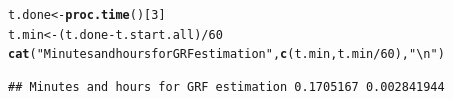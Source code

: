 \documentclass[9pt]{article}\usepackage[]{graphicx}\usepackage[]{xcolor}
\makeatletter
\newcommand{\hlnum}[1]{\textcolor[rgb]{0.686,0.059,0.569}{#1}}%
\newcommand{\hlstr}[1]{\textcolor[rgb]{0.192,0.494,0.8}{#1}}%
\newcommand{\hlopt}[1]{\textcolor[rgb]{0,0,0}{#1}}%
\newcommand{\hlstd}[1]{\textcolor[rgb]{0.345,0.345,0.345}{#1}}%
\newcommand{\hlkwb}[1]{\textcolor[rgb]{0.69,0.353,0.396}{#1}}%
\newcommand{\hlkwd}[1]{\textcolor[rgb]{0.737,0.353,0.396}{\textbf{#1}}}%
\newenvironment{kframe}{%
 \def\at@end@of@kframe{}%
 \ifinner\ifhmode%
  \def\at@end@of@kframe{\end{minipage}}%
  \begin{minipage}{\columnwidth}%
 \fi\fi%
 \def\FrameCommand##1{\hskip\@totalleftmargin \hskip-\fboxsep
 \colorbox{shadecolor}{##1}\hskip-\fboxsep
     \hskip-\linewidth \hskip-\@totalleftmargin \hskip\columnwidth}%
 \MakeFramed {\advance\hsize-\width
   \@totalleftmargin\z@ \linewidth\hsize
   \@setminipage}}%
 {\par\unskip\endMakeFramed%
 \at@end@of@kframe}
\newenvironment{knitrout}{}{} %
\theoremstyle{definition}
\theoremstyle{remark}
\makeatother
\begin{document}
\begin{knitrout}
\color{fgcolor}\begin{kframe}
\begin{alltt}
\hlstd{t.done} \hlkwb{<-} \hlkwd{proc.time}\hlstd{()[}\hlnum{3}\hlstd{]}
\hlstd{t.min} \hlkwb{<-} \hlstd{(t.done} \hlopt{-} \hlstd{t.start.all)}\hlopt{/}\hlnum{60}
\hlkwd{cat}\hlstd{(}\hlstr{"Minutes and hours for GRF estimation"}\hlstd{,} \hlkwd{c}\hlstd{(t.min, t.min}\hlopt{/}\hlnum{60}\hlstd{),} \hlstr{"\textbackslash{}n"}\hlstd{)}
\end{alltt}
\begin{verbatim}
## Minutes and hours for GRF estimation 0.1705167 0.002841944
\end{verbatim}
\end{kframe}
\end{knitrout}
\end{document}
